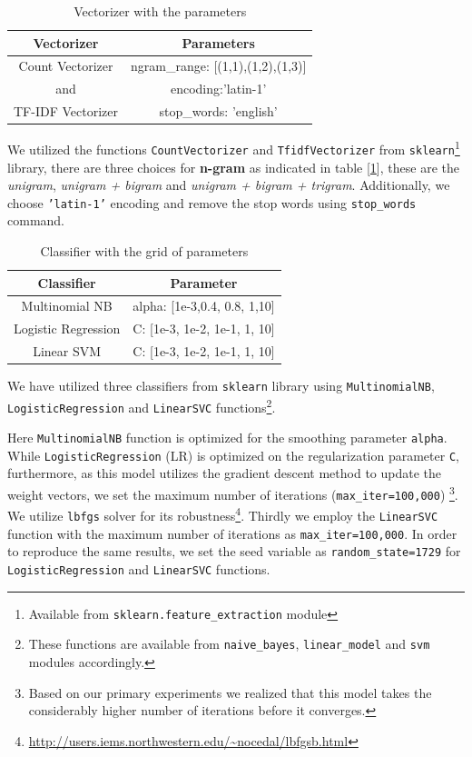 \documentclass[11pt]{article}
\begin{document}
 \begin{table}[h!]
\small
     \centering
     \begin{tabular}{c|c}
     \hline 
         \textbf{Vectorizer} & \textbf{Parameters}  \\ \hline 
          Count Vectorizer & ngram\_range: [(1,1),(1,2),(1,3)]\\
          and & encoding:'latin-1'\\
          TF-IDF Vectorizer & stop\_words: 'english' \\
          \hline 
     \end{tabular}
     \caption{Vectorizer with the parameters}
     \label{tab:vectorizer_paras}
 \end{table}
We utilized the functions \texttt{CountVectorizer} and \texttt{TfidfVectorizer} from \texttt{sklearn}\footnote{Available from \texttt{sklearn.feature\_extraction} module} library, there are three choices for \textbf{n-gram} as indicated in table [\ref{tab:vectorizer_paras}], these are the \textit{unigram}, \textit{unigram + bigram} and \textit{unigram + bigram + trigram}.
Additionally, we choose \texttt{'latin-1'} encoding and remove the stop words using \texttt{stop\_words} command.
\begin{table}[h!]
\scriptsize
    \centering
    \begin{tabular}{c|c}
    \hline
   \textbf{Classifier} & \textbf{Parameter} \\ \hline 
     Multinomial NB & alpha: [1e-3,0.4, 0.8, 1,10] \\ 
      Logistic Regression &  C: [1e-3, 1e-2, 1e-1, 1, 10] \\
      Linear SVM & C: [1e-3, 1e-2, 1e-1, 1, 10] \\\hline 
    \end{tabular}
    \caption{Classifier with the grid of parameters}
    \label{tab:classfiers_para}
\end{table}
We have utilized three classifiers from \texttt{sklearn} library using \texttt{MultinomialNB}, \texttt{LogisticRegression} and \texttt{LinearSVC} functions\footnote{These functions are available from \texttt{naive\_bayes}, \texttt{linear\_model} and \texttt{svm} modules accordingly.}.

Here \texttt{MultinomialNB} function is optimized for the smoothing parameter \texttt{alpha}. While \texttt{LogisticRegression} (LR) is optimized on the regularization parameter \texttt{C}, furthermore, as this model utilizes the gradient descent method to update the weight vectors, we set the maximum number of iterations (\texttt{max\_iter=100,000}) \footnote{Based on our primary experiments we realized that this model takes the considerably higher number of iterations before it converges.}. We utilize \texttt{lbfgs} solver \cite{lbfgs} for its robustness\footnote{\url{http://users.iems.northwestern.edu/~nocedal/lbfgsb.html}}.
Thirdly we employ the \texttt{LinearSVC} function with the maximum number of iterations as \texttt{max\_iter=100,000}. In order to reproduce the same results, we set the seed variable as \texttt{random\_state=1729} for \texttt{LogisticRegression} and \texttt{LinearSVC} functions. 
\end{document}

